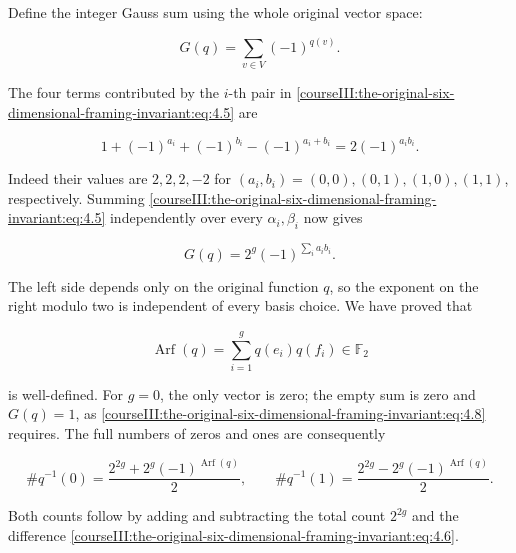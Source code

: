 Define the integer Gauss sum using the whole original vector space:

\begin{equation}
G(q)=\sum_{v\in V}(-1)^{q(v)}.
 \label{courseIII:the-original-six-dimensional-framing-invariant:eq:4.6}
\end{equation}

The four terms contributed by the \(i\)-th pair in \eqref{courseIII:the-original-six-dimensional-framing-invariant:eq:4.5} are

\begin{equation}
1+(-1)^{a_i}+(-1)^{b_i}-(-1)^{a_i+b_i}
      =2(-1)^{a_i b_i}.
 \label{courseIII:the-original-six-dimensional-framing-invariant:eq:4.7}
\end{equation}

Indeed their values are \(2,2,2,-2\) for \((a_i,b_i)=(0,0),(0,1),(1,0),(1,1)\), respectively. Summing \eqref{courseIII:the-original-six-dimensional-framing-invariant:eq:4.5} independently over every \(\alpha_i,\beta_i\) now gives

\begin{equation}
G(q)=2^g(-1)^{\sum_i a_i b_i}.
 \label{courseIII:the-original-six-dimensional-framing-invariant:eq:4.8}
\end{equation}

The left side depends only on the original function \(q\), so the exponent on the right modulo two is independent of every basis choice. We have proved that

\begin{equation}
\operatorname{Arf}(q)=\sum_{i=1}^gq(e_i)q(f_i)\in\mathbb F_2
 \label{courseIII:the-original-six-dimensional-framing-invariant:eq:4.9}
\end{equation}

is well-defined. For \(g=0\), the only vector is zero; the empty sum is zero and \(G(q)=1\), as \eqref{courseIII:the-original-six-dimensional-framing-invariant:eq:4.8} requires. The full numbers of zeros and ones are consequently

\begin{equation}
\#q^{-1}(0)=\frac{2^{2g}+2^g(-1)^{\operatorname{Arf}(q)}}2,
 \qquad
 \#q^{-1}(1)=\frac{2^{2g}-2^g(-1)^{\operatorname{Arf}(q)}}2.
 \label{courseIII:the-original-six-dimensional-framing-invariant:eq:4.10}
\end{equation}

Both counts follow by adding and subtracting the total count \(2^{2g}\) and the difference \eqref{courseIII:the-original-six-dimensional-framing-invariant:eq:4.6}.

